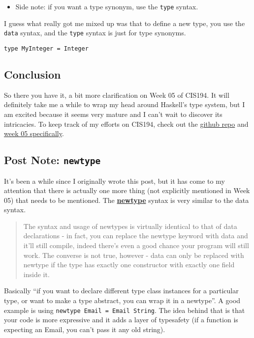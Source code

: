 \documentclass[12pt]{article}
\newcommand{\tightlist}{\setlength{\itemsep}{0pt}\setlength{\parskip}{0pt}}
\begin{document}
\begin{itemize}
\tightlist
\item
  Side note: if you want a type synonym, use the \texttt{type} syntax.
\end{itemize}

I guess what really got me mixed up was that to define a new type, you
use the \texttt{data} syntax, and the \texttt{type} syntax is just for
type synonyms.

\begin{lstlisting} 
type MyInteger = Integer 
\end{lstlisting}

\subsection{Conclusion}\label{conclusion}

So there you have it, a bit more clarification on Week 05 of CIS194. It
will definitely take me a while to wrap my head around Haskell's type
system, but I am excited because it seems very mature and I can't wait
to discover its intricacies. To keep track of my efforts on CIS194,
check out the \href{https://github.com/2016rshah/CIS194}{github repo}
and \href{https://github.com/2016rshah/CIS194/tree/master/05}{week 05
specifically}.

\subsection{\texorpdfstring{Post Note:
\texttt{newtype}}{Post Note: newtype}}\label{post-note-newtype}

It's been a while since I originally wrote this post, but it has come to
my attention that there is actually one more thing (not explicitly
mentioned in Week 05) that needs to be mentioned. The
\href{https://wiki.haskell.org/Newtype}{\textbf{newtype}} syntax is very
similar to the data syntax.

\begin{quote}
The syntax and usage of newtypes is virtually identical to that of data
declarations - in fact, you can replace the newtype keyword with data
and it'll still compile, indeed there's even a good chance your program
will still work. The converse is not true, however - data can only be
replaced with newtype if the type has exactly one constructor with
exactly one field inside it.
\end{quote}

Basically ``if you want to declare different type class instances for a
particular type, or want to make a type abstract, you can wrap it in a
newtype''. A good example is using
\texttt{newtype\ Email\ =\ Email\ String}. The idea behind that is that
your code is more expressive and it adds a layer of typesafety (if a
function is expecting an Email, you can't pass it any old string).
\end{document}
